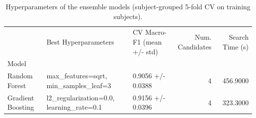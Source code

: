 \begin{table}
\caption{Hyperparameters of the ensemble models (subject-grouped 5-fold CV on training subjects).}
\label{tab:Ext01_ensemble_hyperparameters}
\begin{tabular}{lllrr}
\toprule
 & Best Hyperparameters & CV Macro-F1 (mean +/- std) & Num. Candidates & Search Time (s) \\
Model &  &  &  &  \\
\midrule
Random Forest & max_features=sqrt, min_samples_leaf=3 & 0.9056 +/- 0.0388 & 4 & 456.9000 \\
Gradient Boosting & l2_regularization=0.0, learning_rate=0.1 & 0.9156 +/- 0.0396 & 4 & 323.3000 \\
\bottomrule
\end{tabular}
\end{table}
